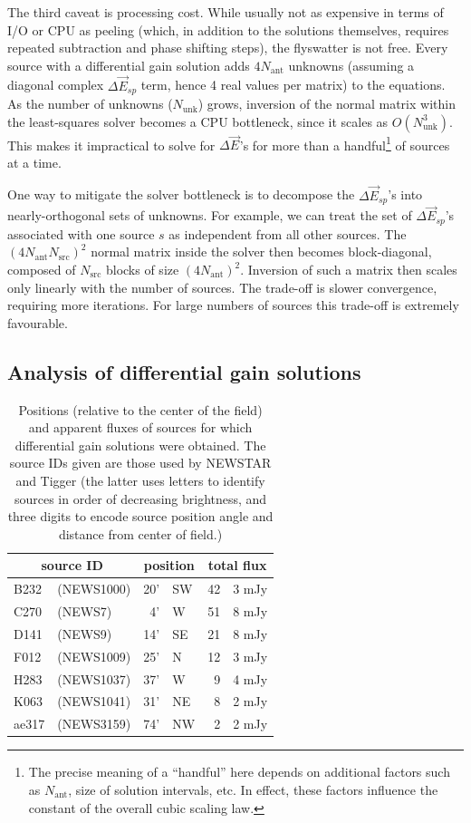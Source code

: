 \documentclass[]{aa}
\newcommand{\jones}[2]{\vec {#1}_{#2}}
\begin{document}
The third caveat is processing cost. While usually not as expensive in terms of I/O or CPU as peeling (which, in addition to the solutions themselves, requires repeated subtraction and phase shifting steps), the flyswatter is not free. Every source with a differential gain solution adds $4N_\mathrm{ant}$ unknowns (assuming a diagonal complex $\Delta\jones{E}{sp}$ term, hence 4 real values per matrix) to the equations. As the number of unknowns ($N_\mathrm{unk}$) grows, inversion of the normal matrix within the least-squares solver becomes a CPU bottleneck, since it scales as $O(N_\mathrm{unk}^3)$. This makes it impractical to solve for $\Delta\jones{E}{}$'s for more than a handful\footnote{The precise meaning of a ``handful'' here depends on additional factors such as $N_\mathrm{ant}$, size of solution intervals, etc. In effect, these factors influence the constant of the overall cubic scaling law.} of sources at a time. 

One way to mitigate the solver bottleneck is to decompose the $\Delta\jones{E}{sp}$'s into nearly-orthogonal sets of unknowns. For example, we can treat the set of $\Delta\jones{E}{sp}$'s associated with one source $s$ as independent from all other sources. The $(4N_\mathrm{ant}N_\mathrm{src})^2$ normal matrix inside the solver then becomes block-diagonal, composed of $N_\mathrm{src}$ blocks of size $(4N_\mathrm{ant})^2$. Inversion of such a matrix then scales only linearly with the number of sources. The trade-off is slower convergence, requiring more iterations. For large numbers of sources this trade-off is extremely favourable.

\subsection{Analysis of differential gain solutions\label{sec:de-analysis}}

\begin{table}
\centering
\begin{tabular}{ll|r@{ }l|r@{.}l}
\hline
\multicolumn{2}{c}{source ID} & \multicolumn{2}{|c|}{position} & \multicolumn{2}{c}{total flux} \\
\hline
B232 & (NEWS1000)   & 20' & SW & 42 & 3 mJy\\
C270 & (NEWS7)      &  4' & W  & 51 & 8 mJy\\
D141 & (NEWS9)      & 14' & SE & 21 & 8 mJy\\
F012 & (NEWS1009)   & 25' & N  & 12 & 3 mJy \\
H283 & (NEWS1037)   & 37' & W  &  9 & 4 mJy \\
K063 & (NEWS1041)   & 31' & NE &  8 & 2 mJy \\
ae317 & (NEWS3159)  & 74' & NW &  2 & 2 mJy \\
\hline
\end{tabular}
\caption{\label{tab:sources}Positions (relative to the center of the field) and apparent fluxes of sources for which differential gain solutions were obtained. The source IDs given are those used by NEWSTAR and Tigger (the latter uses letters to identify sources in order of decreasing brightness, and three digits to encode source position angle and distance from center of field.)}
\end{table}
\end{document}
